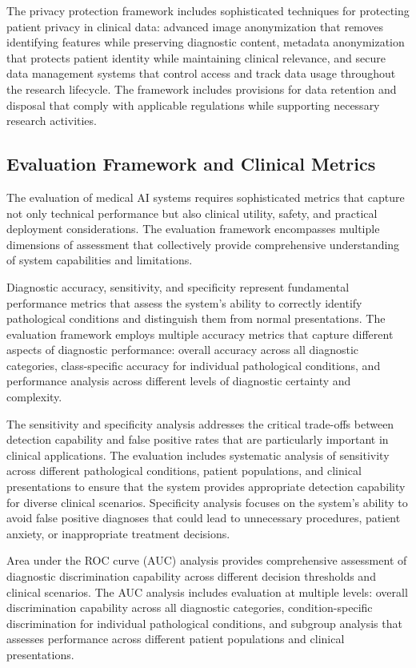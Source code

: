 The privacy protection framework includes sophisticated techniques for protecting patient privacy in clinical data: advanced image anonymization that removes identifying features while preserving diagnostic content, metadata anonymization that protects patient identity while maintaining clinical relevance, and secure data management systems that control access and track data usage throughout the research lifecycle. The framework includes provisions for data retention and disposal that comply with applicable regulations while supporting necessary research activities.

\subsection{Evaluation Framework and Clinical Metrics}

The evaluation of medical AI systems requires sophisticated metrics that capture not only technical performance but also clinical utility, safety, and practical deployment considerations. The evaluation framework encompasses multiple dimensions of assessment that collectively provide comprehensive understanding of system capabilities and limitations.

Diagnostic accuracy, sensitivity, and specificity represent fundamental performance metrics that assess the system's ability to correctly identify pathological conditions and distinguish them from normal presentations. The evaluation framework employs multiple accuracy metrics that capture different aspects of diagnostic performance: overall accuracy across all diagnostic categories, class-specific accuracy for individual pathological conditions, and performance analysis across different levels of diagnostic certainty and complexity.

The sensitivity and specificity analysis addresses the critical trade-offs between detection capability and false positive rates that are particularly important in clinical applications. The evaluation includes systematic analysis of sensitivity across different pathological conditions, patient populations, and clinical presentations to ensure that the system provides appropriate detection capability for diverse clinical scenarios. Specificity analysis focuses on the system's ability to avoid false positive diagnoses that could lead to unnecessary procedures, patient anxiety, or inappropriate treatment decisions.

Area under the ROC curve (AUC) analysis provides comprehensive assessment of diagnostic discrimination capability across different decision thresholds and clinical scenarios. The AUC analysis includes evaluation at multiple levels: overall discrimination capability across all diagnostic categories, condition-specific discrimination for individual pathological conditions, and subgroup analysis that assesses performance across different patient populations and clinical presentations.

